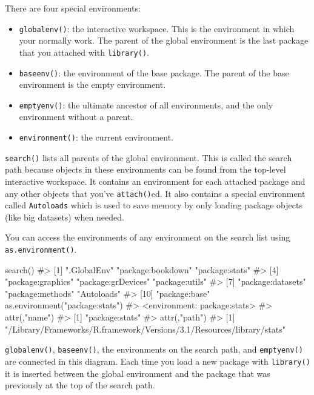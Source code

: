\documentclass[oneside]{book}
\newenvironment{Shaded}{}{}
\newcommand{\KeywordTok} [1]{\textcolor[rgb]{0.00,0.44,0.13}{{#1}}}
\newcommand{\StringTok}  [1]{\textcolor[rgb]{0.25,0.44,0.63}{{#1}}}
\newcommand{\CommentTok} [1]{\textcolor[rgb]{0.38,0.63,0.69}{{#1}}}
\newcommand{\NormalTok}  [1]{{#1}}
\begin{document}
There are four special environments:

\begin{itemize}
\item
  \texttt{globalenv()}: the interactive workspace. This is the
  environment in which your normally work. The parent of the global
  environment is the last package that you attached with
  \texttt{library()}.
\item
  \texttt{baseenv()}: the environment of the base package. The parent of
  the base environment is the empty environment.
\item
  \texttt{emptyenv()}: the ultimate ancestor of all environments, and
  the only environment without a parent.
\item
  \texttt{environment()}: the current environment.
\end{itemize}

\texttt{search()} lists all parents of the global environment. This is
called the search path because objects in these environments can be
found from the top-level interactive workspace. It contains an
environment for each attached package and any other objects that you've
\texttt{attach()}ed. It also contains a special environment called
\texttt{Autoloads} which is used to save memory by only loading package
objects (like big datasets) when needed.

You can access the environments of any environment on the search list
using \texttt{as.environment()}.

\begin{Shaded}
\begin{Highlighting}[]
\KeywordTok{search}\NormalTok{()}
\CommentTok{#>  [1] ".GlobalEnv"        "package:bookdown"  "package:stats"    }
\CommentTok{#>  [4] "package:graphics"  "package:grDevices" "package:utils"    }
\CommentTok{#>  [7] "package:datasets"  "package:methods"   "Autoloads"        }
\CommentTok{#> [10] "package:base"}
\KeywordTok{as.environment}\NormalTok{(}\StringTok{"package:stats"}\NormalTok{)}
\CommentTok{#> <environment: package:stats>}
\CommentTok{#> attr(,"name")}
\CommentTok{#> [1] "package:stats"}
\CommentTok{#> attr(,"path")}
\CommentTok{#> [1] "/Library/Frameworks/R.framework/Versions/3.1/Resources/library/stats"}
\end{Highlighting}
\end{Shaded}

\texttt{globalenv()}, \texttt{baseenv()}, the environments on the search
path, and \texttt{emptyenv()} are connected in this diagram. Each time
you load a new package with \texttt{library()} it is inserted between
the global environment and the package that was previously at the top of
the search path.
\end{document}
